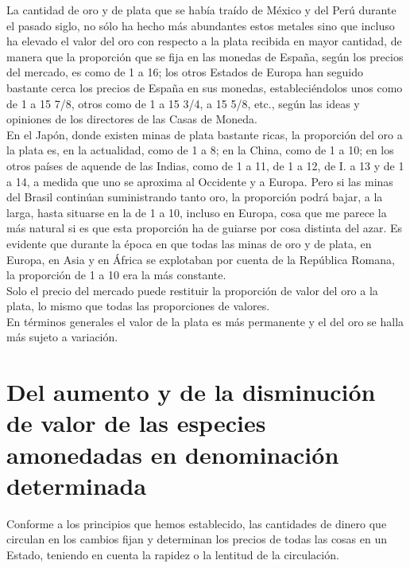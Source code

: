 \documentclass[10pt]{article}
\begin{document}
\begin{multicols}{1}
La cantidad de oro y de plata que se había traído de México y del Perú durante el pasado siglo, no sólo ha hecho más abundantes estos metales sino que incluso ha elevado el valor del oro con respecto a la plata recibida en mayor cantidad, de manera que la proporción que se fija en las monedas de España, según los precios del mercado, es como de 1 a 16; los otros Estados de Europa han seguido bastante cerca los precios de España en sus monedas, estableciéndolos unos como de 1 a 15 7/8, otros como de 1 a 15 3/4, a 15 5/8, etc., según las ideas y opiniones de los directores de las Casas de Moneda.\\
En el Japón, donde existen minas de plata bastante ricas, la proporción del oro a la plata es, en la actualidad, como de 1 a 8; en la China, como de 1 a 10; en los otros países de aquende de las Indias, como de 1 a 11, de 1 a 12, de I. a 13 y de 1 a 14, a medida que uno se aproxima al Occidente y a Europa. Pero si las minas del Brasil continúan suministrando tanto oro, la proporción podrá bajar, a la larga, hasta situarse en la de 1 a 10, incluso en Europa, cosa que me parece la más natural si es que esta proporción ha de guiarse por cosa distinta del azar. Es evidente que durante la época en que todas las minas de oro y de plata, en Europa, en Asia y en África se explotaban por cuenta de la República Romana, la proporción de 1 a 10 era la más constante.\\
Solo el precio del mercado puede restituir la proporción de valor del oro a la plata, lo mismo que todas las proporciones de valores.\\
En términos generales el valor de la plata es más permanente y el del oro se halla más sujeto a variación.
\section*{Del aumento y de la disminución de valor de las especies amonedadas en denominación determinada}
Conforme a los principios que hemos establecido, las cantidades de dinero que circulan en los cambios fijan y determinan los precios de todas las cosas en un Estado, teniendo en cuenta la rapidez o la lentitud de la circulación.

\end{multicols}
\end{document}
